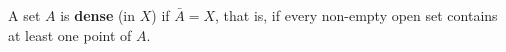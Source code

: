 A set $A$ is \textbf{dense} (in $X$) if $\bar{A} = X$, that is, if every non-empty open set contains at least one point of $A$.
